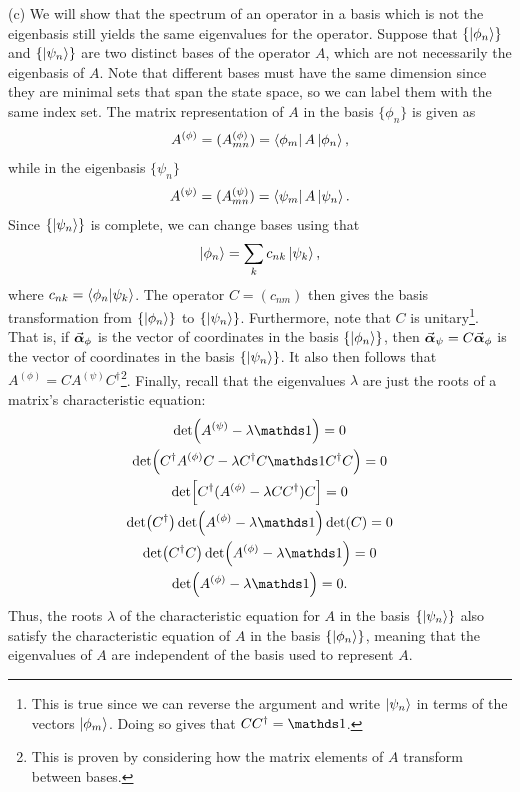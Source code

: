 {(c) We will show that the spectrum of an operator in a basis which is not the eigenbasis still yields the same eigenvalues for the operator.
Suppose that $\{ \ket{\phi_{n}} \} $ and $\{ \ket{\psi_{n}} \}$ are two distinct bases of the operator $A$, which are not necessarily the eigenbasis of $A$.
Note that different bases must have the same dimension since they are minimal sets that span the state space, so we can label them with the same index set.
The matrix representation of $A$ in the basis $\{ \phi_{n} \}$ is given as
\begin{eqnarray}
    A^{(\phi)} = (A^{(\phi)}_{mn}) = \bra{\phi_{m}} A \ket{\phi_{n}}
,\end{eqnarray}
while in the eigenbasis $\{ \psi_{n} \} $
\begin{eqnarray}
    A^{(\psi)} = (A^{(\psi)}_{mn}) = \bra{\psi_{m}} A \ket{\psi_{n}}
.\end{eqnarray}
Since $\{ \ket{\psi_{n}} \} $ is complete, we can change bases using that
\begin{eqnarray}
    \ket{ \phi_{n} } = \sum_{k} c_{nk} \ket{\psi_{k}}
,\end{eqnarray}
where $c_{nk} = \bra{\phi_{n}}\ket{\psi_{k}}$.
The operator $C = (c_{nm})$ then gives the basis transformation from $\{ \ket{ \phi_{n} } \} $ to $\{ \ket{\psi_{n}} \} $.
Furthermore, note that $C$ is unitary\footnote{This is true since we can reverse the argument and write $\ket{\psi_{n}}$ in terms of the vectors $\ket{\phi_{m}}$. Doing so gives that $C C^{\dagger} = \id$.}.
That is, if $\va*{\alpha}_{\phi}$ is the vector of coordinates in the basis $\{ \ket{ \phi_{n} } \} $, then $\va*{\alpha}_{\psi} = C \va*{\alpha}_{\phi}$ is the vector of coordinates in the basis $\{ \ket{ \psi_{n} } \} $.
It also then follows that $A^{(\phi)} = C A^{(\psi)} C^{\dagger}$\footnote{This is proven by considering how the matrix elements of $A$ transform between bases.}.
Finally, recall that the eigenvalues $\lambda$ are just the roots of a matrix's characteristic equation:
\begin{gather}
    \det(A^{(\psi)} - \lambda \id) = 0 \nonumber \\
    \det(C^{\dagger} A^{(\phi)} C - \lambda C^{\dagger} C \id C^{\dagger} C) = 0 \nonumber \\
    \det[ C^{\dagger} ( A^{(\phi)} - \lambda C C^{\dagger} ) C ] = 0 \nonumber \\
    \det(C^{\dagger}) \det(A^{(\phi)} - \lambda \id ) \det(C) = 0 \nonumber \\
    \det(C^{\dagger} C) \det(A^{(\phi)} - \lambda \id) = 0 \nonumber \\
    \det(A^{(\phi)} - \lambda \id) = 0
.\end{gather}
Thus, the roots $\lambda$ of the characteristic equation for $A$ in the basis $\{ \ket{\psi_{n}} \}$ also satisfy the characteristic equation of $A$ in the basis $\{ \ket{\phi_{n}} \}$, meaning that the eigenvalues of $A$ are independent of the basis used to represent $A$.

}
